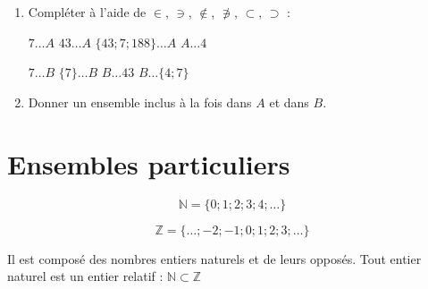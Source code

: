 \begin{exerciseT} \hfill 
	\begin{enumerate}[leftmargin=*]
		\item 	Compléter à l'aide de $\in$, $\ni$, $\notin$, $\not\ni$, $\subset$, $\supset$  :
		
		$ 7\ldots A$ \qquad $43 \ldots A$ \qquad $\{43; 7; 188\} \ldots A$ \qquad $A\ldots 4$ 
		
		$ 7\ldots B$ \qquad $ \{7\}\ldots B$ \qquad $B \ldots 43$ \qquad $B\ldots \{ 4; 7\}$ \qquad 
		\item Donner un ensemble inclus à la fois dans $A$ et dans $B$.
	\end{enumerate}
\end{exerciseT} 
%	 
\section{Ensembles particuliers}

\begin{definition}
	$$\mathbb{N}=\{0;1;2;3;4;\dots\}$$ 
\end{definition}

\begin{definition}
	$$\mathbb{Z}=\{\dots;-2;-1;0;1;2;3;\dots\}$$
\end{definition} 
Il est composé des nombres entiers naturels et de leurs opposés.
Tout entier naturel est un entier relatif : $\mathbb{N}\subset \mathbb{Z}$ 
\begin{definition}
\end{definition}

